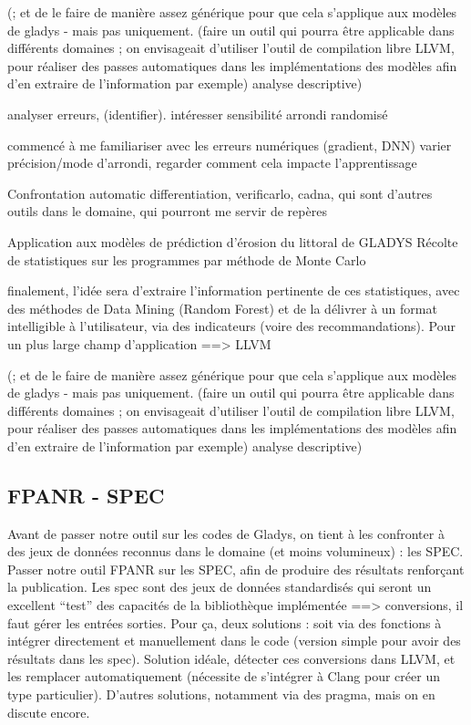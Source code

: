 \documentclass[a4paper,11pt]{article}
\begin{document}
 (; et de le faire de manière assez générique pour que cela s’applique aux modèles de gladys - mais pas uniquement.
(faire un outil qui pourra être applicable dans différents domaines ; on envisageait d’utiliser l’outil de compilation libre LLVM, pour réaliser des passes automatiques dans les implémentations des modèles afin d’en extraire de l’information par exemple)
analyse descriptive)


analyser erreurs, (identifier).
intéresser sensibilité arrondi randomisé

commencé à me familiariser avec les erreurs numériques (gradient, DNN)
varier précision/mode d’arrondi, regarder comment cela impacte l’apprentissage

Confrontation
automatic differentiation, verificarlo, cadna, qui sont d’autres outils dans le domaine, qui pourront me servir de repères

Application aux modèles de prédiction d’érosion du littoral de GLADYS
Récolte de statistiques sur les programmes par méthode de Monte Carlo

finalement, l’idée sera d’extraire l’information pertinente de ces statistiques, avec des méthodes de Data Mining (Random Forest)
et de la délivrer à un format intelligible à l’utilisateur, via des indicateurs (voire des recommandations).
Pour un plus large champ d’application ==> LLVM

 (; et de le faire de manière assez générique pour que cela s’applique aux modèles de gladys - mais pas uniquement.
(faire un outil qui pourra être applicable dans différents domaines ; on envisageait d’utiliser l’outil de compilation libre LLVM, pour réaliser des passes automatiques dans les implémentations des modèles afin d’en extraire de l’information par exemple)
analyse descriptive)


\subsection{FPANR - SPEC}
Avant de passer notre outil sur les codes de Gladys, on tient à les confronter à des jeux de données reconnus dans le domaine (et moins volumineux) : les SPEC.
Passer notre outil FPANR sur les SPEC, afin de produire des résultats renforçant  la publication. Les spec sont des jeux de données standardisés qui seront un excellent “test” des capacités de la bibliothèque implémentée
==> conversions, il faut gérer les entrées sorties. Pour ça, deux solutions : soit via des fonctions à intégrer directement et manuellement dans le code (version simple pour avoir des résultats dans les spec). Solution idéale, détecter ces conversions dans LLVM, et les remplacer automatiquement (nécessite de s’intégrer à Clang pour créer un type particulier). D’autres solutions, notamment via des pragma, mais on en discute encore.
\end{document}
